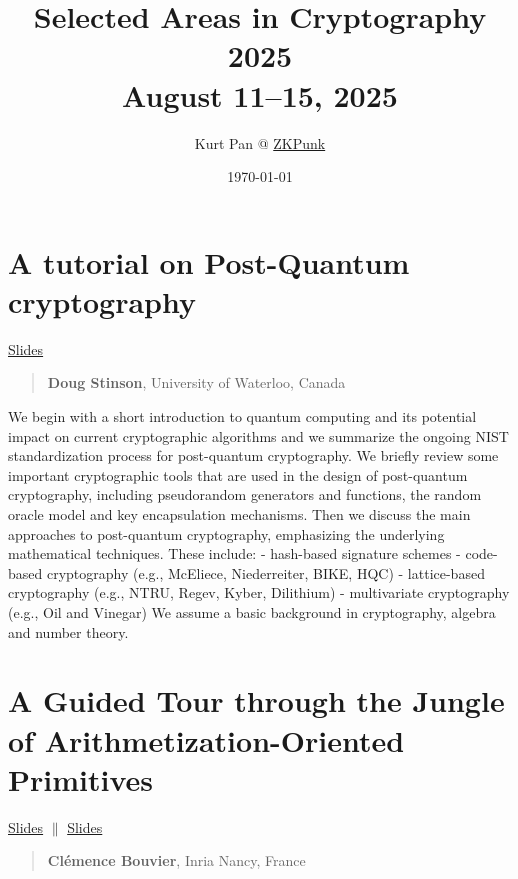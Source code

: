 \documentclass[11pt]{article}
\theoremstyle{definition}
\theoremstyle{remark}
\theoremstyle{plain}
\begin{document}
\title{Selected Areas in Cryptography 2025 \\ \small{August 11–15, 2025}}
\author{Kurt Pan @ \href{https://zkpunk.pro}{ZKPunk}}
\date{\today}
\maketitle
\tableofcontents

\section{A tutorial on Post-Quantum cryptography}
\begin{center}
\href{https://sacworkshop.org/SAC25/slides/stinson.pdf}{Slides}
\end{center}

\begin{quote}
\textbf{Doug Stinson}, University of Waterloo, Canada
\end{quote}

We begin with a short introduction to quantum computing and its potential impact on current cryptographic algorithms and we summarize the ongoing NIST standardization process for post-quantum cryptography. We briefly review some important cryptographic tools that are used in the design of post-quantum cryptography, including pseudorandom generators and functions, the random oracle model and key encapsulation mechanisms. Then we discuss the main approaches to post-quantum cryptography, emphasizing the underlying mathematical techniques. These include: - hash-based signature schemes - code-based cryptography (e.g., McEliece, Niederreiter, BIKE, HQC) - lattice-based cryptography (e.g., NTRU, Regev, Kyber, Dilithium) - multivariate cryptography (e.g., Oil and Vinegar) We assume a basic background in cryptography, algebra and number theory.

\section{A Guided Tour through the Jungle of Arithmetization-Oriented Primitives}
\begin{center}
\href{https://sacworkshop.org/SAC25/slides/bouvier1.pdf}{Slides} $\|$ \href{https://sacworkshop.org/SAC25/slides/bouvier2.pdf}{Slides}
\end{center}

\begin{quote}
\textbf{Clémence Bouvier}, Inria Nancy, France
\end{quote}
\end{document}
